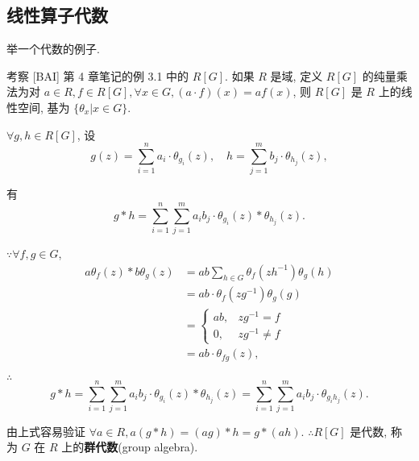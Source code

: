 \documentclass[color=black,device=normal,lang=cn,mode=geye]{elegantnote}
\begin{document}
\subsection{线性算子代数}
举一个代数的例子.
\begin{example}
    考察 [BAI] 第 4 章笔记的例 3.1 中的 $R[G]$. 如果 $R$ 是域, 定义 $R[G]$ 的纯量乘法为对 $a\in R,f\in R[G],\forall x\in G,(a\cdot f)(x)=af(x)$, 则 $R[G]$ 是 $R$ 上的线性空间, 基为 $\{\theta_x|x\in G\}$.
    
    $\forall g,h\in R[G]$, 设
    \[g(z)=\sum\limits_{i=1}^{n}a_i\cdot\theta_{g_i}(z),\quad h=\sum\limits_{j=1}^{m}b_j\cdot\theta_{h_j}(z),\]
    
    有
    \[g*h=\sum\limits_{i=1}^{n}\sum\limits_{j=1}^{m}a_ib_j\cdot\theta_{g_i}(z)*\theta_{h_j}(z).\]

    $\because\forall f,g\in G$,
    \begin{align*}
        a\theta_f(z)*b\theta_g(z) & =ab\sum\limits_{h\in G}\theta_f(zh^{-1})\theta_g(h) \\
        & =ab\cdot\theta_f(zg^{-1})\theta_g(g) \\
        & =\begin{cases}
                ab, & zg^{-1}=f \\
                0, & zg^{-1}\neq f
            \end{cases} \\
        & =ab\cdot\theta_{fg}(z),
    \end{align*}

    $\therefore$
    \[g*h=\sum\limits_{i=1}^{n}\sum\limits_{j=1}^{m}a_ib_j\cdot\theta_{g_i}(z)*\theta_{h_j}(z)=\sum\limits_{i=1}^{n}\sum\limits_{j=1}^{m}a_ib_j\cdot\theta_{g_ih_j}(z).\]

    由上式容易验证 $\forall a\in R,a(g*h)=(ag)*h=g*(ah)$. $\therefore R[G]$ 是代数, 称为 $G$ 在 $R$ 上的\textbf{群代数}(group algebra).
\end{example}
\end{document}
